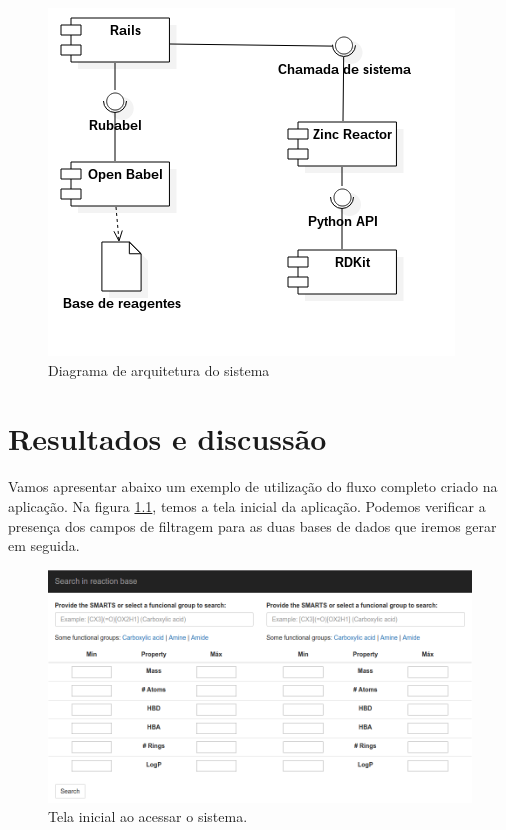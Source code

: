 \documentclass{abnt}
\begin{document}
\begin{figure}[!htb]
  \centering
  \includegraphics[scale=0.8]{diagrama_de_arquitetura.png}
  \caption{Diagrama de arquitetura do sistema}
  \label{fig:arq}
\end{figure}

\chapter{Resultados e discussão}

Vamos apresentar abaixo um exemplo de utilização do fluxo completo criado na
aplicação. Na figura \ref{fig:react1}, temos a tela inicial da aplicação. Podemos
verificar a presença dos campos de filtragem para as duas bases de dados que iremos
gerar em seguida.

\begin{figure}[!htb]
  \centering
  \includegraphics[scale=0.5]{reaction1}
  \caption{Tela inicial ao acessar o sistema.}
  \label{fig:react1}
\end{figure}
\end{document}
